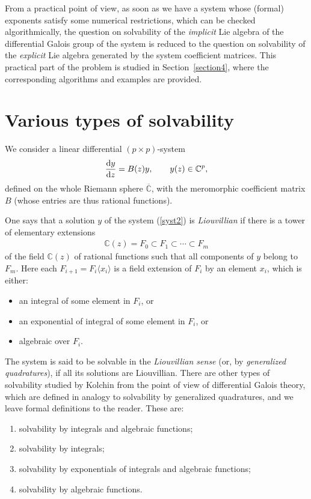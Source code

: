 \documentclass[pdftex]{sigma}
\numberwithin{equation}{section}
\begin{document}
From a practical point of view, as soon as we have a system whose (formal) exponents satisfy some numerical restrictions, which can be checked algorithmically, the question on solvability of the {\it implicit} Lie algebra of the differential Galois group of the system is reduced to the question on solvability of the {\it explicit} Lie algebra generated by the system coefficient matrices. This practical part of the problem is studied in Section~\ref{section4}, where the corresponding algorithms and examples are provided.

\section{Various types of solvability}\label{section2}

We consider a linear differential $(p\times p)$-system
\begin{gather}\label{syst2}
\frac{{\rm d}y}{{\rm d}z}=B(z) y,\qquad y(z)\in{\mathbb C}^p,
\end{gather}
defined on the whole Riemann sphere $\overline{\mathbb C}$, with the meromorphic coefficient matrix $B$ (whose entries are
thus rational functions).

One says that a solution $y$ of the system (\ref{syst2}) is {\it Liouvillian} if there is a tower of elementary
extensions
\begin{gather*}
{\mathbb C}(z)=F_0\subset F_1\subset\cdots\subset F_m
\end{gather*}
of the field ${\mathbb C}(z)$ of rational functions such that all components of $y$ belong to $F_m$. Here each
$F_{i+1}=F_i\langle x_i\rangle$ is a field extension of $F_i$ by an element $x_i$, which is either:
\begin{itemize}	\itemsep=0pt
	\item[--] an integral of some element in $F_i$, or
	\item[--] an exponential of integral of some element in $F_i$, or
	\item[--] algebraic over $F_i$.
\end{itemize}
The system is said to be solvable in the {\it Liouvillian sense} (or, by {\it generalized quadratures}),
if all its solutions are Liouvillian. There are other types of solvability studied by Kolchin \cite{Ko} from the point of
view of differential Galois theory, which are defined in analogy to solvability by generalized quadratures, and we leave
formal definitions to the reader. These are:
\begin{enumerate}	\itemsep=0pt
	\item[1)] solvability by integrals and algebraic functions;
	\item[2)] solvability by integrals;
	\item[3)] solvability by exponentials of integrals and algebraic functions;
	\item[4)] solvability by algebraic functions.
\end{enumerate}
\end{document}
